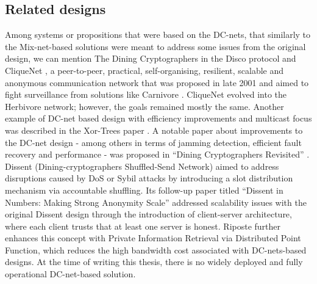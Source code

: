 \subsection{Related designs}
Among systems or propositions that were based on the DC-nets, that similarly to the Mix-net-based solutions were meant to address some issues from the original design, we can mention The Dining Cryptographers in the Disco protocol \cite{dc-disco} and CliqueNet \cite{clique-net}, a peer-to-peer, practical, self-organising, resilient, scalable and anonymous communication network that was proposed in late 2001 and aimed to fight surveillance from solutions like Carnivore \cite{carnivore}. CliqueNet evolved into the Herbivore \cite{herbivore} network; however, the goals remained mostly the same. Another example of DC-net based design with efficiency improvements and multicast focus was described in the Xor-Trees paper \cite{xor-trees}. A notable paper about improvements to the DC-net design - among others in terms of jamming detection, efficient fault recovery and performance - was proposed in “Dining Cryptographers Revisited” \cite{dc-revisited}. Dissent (Dining-cryptographers Shuffled-Send Network) \cite{dissent} aimed to address disruptions caused by DoS or Sybil attacks by introducing a slot distribution mechanism via accountable shuffling. Its follow-up paper titled “Dissent in Numbers: Making Strong Anonymity Scale” \cite{dissent2} addressed scalability issues with the original Dissent design through the introduction of client-server architecture, where each client trusts that at least one server is honest. Riposte \cite{riposte} further enhances this concept with Private Information Retrieval via Distributed Point Function, which reduces the high bandwidth cost associated with DC-nets-based designs. At the time of writing this thesis, there is no widely deployed and fully operational DC-net-based solution.



